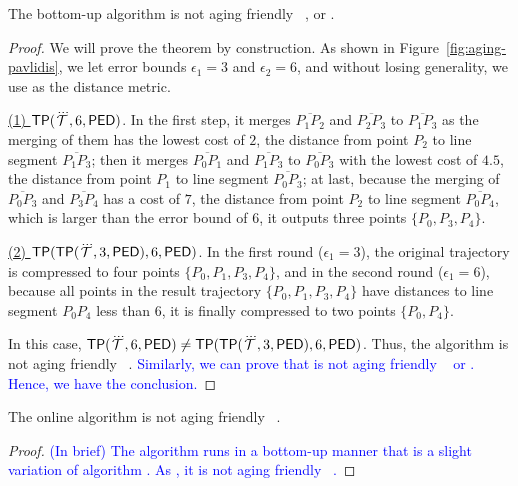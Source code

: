 \begin{theorem}
\label{theo-aging-tp}
The bottom-up algorithm \tpa is not aging friendly \wrt~\ped, \sed or \dad.
\end{theorem}

\begin{proof}
We will prove the theorem by construction.
As shown in Figure~\ref{fig:aging-pavlidis}, we let error bounds $\epsilon_1 =3$ and $\epsilon_2=6$, and without losing generality, we use \ped as the distance metric.

\underline{(1) ${{\mathsf{TP}}}(\dddot{\mathcal{T}}, 6, {\mathsf{PED}})$}. In the first step, it merges $\overline{P_1P_2}$ and $\overline{P_2P_3}$ to $\overline{P_1P_3}$ as the merging of them has the lowest cost of $2$, the distance from point $P_2$ to line segment $\overline{P_1P_3}$; then it merges $\overline{P_0P_1}$ and $\overline{P_1P_3}$ to $\overline{P_0P_3}$ with the lowest cost of $4.5$, the distance from point $P_1$ to line segment $\overline{P_0P_3}$; at last, because the merging of $\overline{P_0P_3}$ and $\overline{P_3P_4}$ has a cost of $7$, the distance from point $P_2$ to line segment $\overline{P_0P_4}$, which is larger than the error bound of $6$, it outputs three points $\{P_0, P_3, P_4\}$.

\underline{(2) ${{\mathsf{TP}}}({\mathsf{TP}}(\dddot{\mathcal{T}}, 3, {\mathsf{PED}}), 6, {\mathsf{PED}})$}. In the first round ($\epsilon_1=3$), the original trajectory is compressed to four points $\{P_0, P_1, P_3, P_4\}$, and in the second round ($\epsilon_1=6$), because all points in the result trajectory $\{P_0, P_1, P_3, P_4\}$ have distances to line segment $P_0P_4$ less than $6$, it is finally compressed to two points $\{P_0, P_4\}$.

In this case, ${{\mathsf{TP}}}(\dddot{\mathcal{T}}, 6, {\mathsf{PED}}) \ne {{\ensuremath {\mathsf{TP}}}}({\mathsf{TP}}(\dddot{\mathcal{T}}, 3, {\mathsf{PED}}), 6, {\mathsf{PED}})$. Thus, the \tpa algorithm is not aging friendly \wrt~\ped.
\textcolor{blue}{Similarly, we can prove that \tpa is not aging friendly \wrt~ \sed or \dad. Hence, we have the conclusion.}
\end{proof}

\begin{lemma}
	\label{theo-aging-tp}
	The online algorithm \squishe is not aging friendly \wrt~\sed.
\end{lemma}

\begin{proof}
	\textcolor{blue}{(In brief) The \squishe algorithm runs in a bottom-up manner that is a slight variation of algorithm \tpa. As \tpa, it is not aging friendly \wrt~\sed.}
\end{proof}

